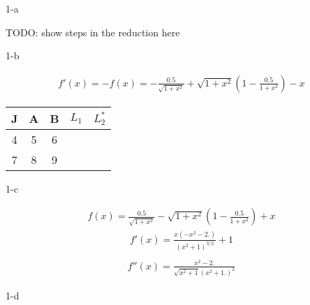 \documentclass[11pt]{article}
\begin{document}
\begin{prob}{1-a}
\end{prob}
\begin{sol} 

TODO: show steps in the reduction here

\end{sol}

\begin{prob}{1-b}
\end{prob}
\begin{sol} 

\begin{eqnarray*}
f'(x) = -f(x) =-\frac{0.5}{\sqrt{1+x^2}}+\sqrt{1+x^2} \left(1-\frac{0.5}{1+x^2}\right)-x 
\end{eqnarray*}


\begin{center}
  \begin{tabular}{| c | c | c | c | c |}
    \hline
    J & A & B & \textbf{$L_{1}$} & \textbf{$L_{2}^{*}$} \\ \hline
    4 & 5 & 6 \\ \hline
    7 & 8 & 9 \\
    \hline
  \end{tabular}
\end{center}

\end{sol}

\begin{prob}{1-c}
\end{prob}
\begin{sol} 

\begin{eqnarray*}
f(x)=\frac{0.5}{\sqrt{1+x^2}}-\sqrt{1+x^2} \left(1-\frac{0.5}{1+x^2}\right)+x 
\end{eqnarray*}
\begin{eqnarray*}
f'(x)=\frac{x \left(-x^2-2.\right)}{\left(x^2+1\right)^{3/2}}+1 \\
\end{eqnarray*}
\begin{eqnarray*}
f''(x)=\frac{x^2-2.}{\sqrt{x^2+1} \left(x^2+1.\right)^2}
\end{eqnarray*}

\end{sol}

\begin{prob}{1-d}
\end{prob}
\begin{sol} 

\end{sol}
\end{document}
